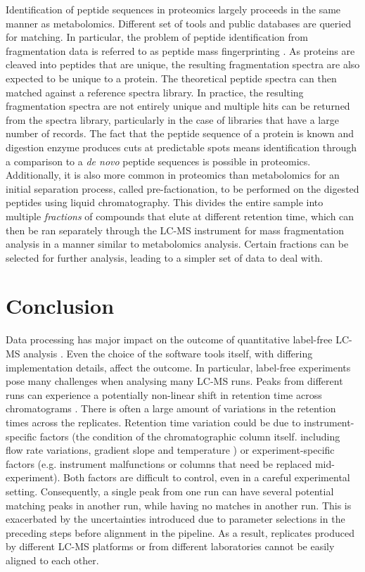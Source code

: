 Identification of peptide sequences in proteomics largely proceeds in the same manner as metabolomics. Different set of tools and public databases are queried for matching. In particular, the problem of peptide identification from fragmentation data is referred to as peptide mass fingerprinting \cite{Sandin2014}. As proteins are cleaved into peptides that are unique, the resulting fragmentation spectra are also expected to be unique to a protein. The theoretical peptide spectra can then matched against a reference spectra library. In practice, the resulting fragmentation spectra are not entirely unique and multiple hits can be returned from the spectra library, particularly in the case of libraries that have a large number of records. The fact that the peptide sequence of a protein is known and digestion enzyme produces cuts at predictable spots means identification through a comparison to a \textit{de novo} peptide sequences is possible in proteomics. Additionally, it is also more common in proteomics than metabolomics for an initial separation process, called pre-factionation, to be performed on the digested peptides using liquid chromatography. This divides the entire sample into multiple \emph{fractions} of compounds that elute at different retention time, which can then be ran separately through the LC-MS instrument for mass fragmentation analysis in a manner similar to metabolomics analysis. Certain fractions can be selected for further analysis, leading to a simpler set of data to deal with.

\section{Conclusion}

Data processing has major impact on the outcome of quantitative label-free LC-MS analysis \cite{Chawade2015}. Even the choice of the software tools itself, with differing implementation details, affect the outcome. In particular, label-free experiments pose many challenges when analysing many LC-MS runs. Peaks from different runs can experience a potentially non-linear shift in retention time across chromatograms \cite{Podwojski2009}. There is often a large amount of variations in the retention times across the replicates. Retention time variation could be due to instrument-specific factors (the condition of the chromatographic column itself. including flow rate variations, gradient slope and temperature \cite{Christin2008}) or experiment-specific factors (e.g. instrument malfunctions or columns that need be replaced mid-experiment). Both factors are difficult to control, even in a careful experimental setting. Consequently, a single peak from one run can have several potential matching peaks in another run, while having no matches in another run. This is exacerbated by the uncertainties introduced due to parameter selections in the preceding steps before alignment in the pipeline. As a result, replicates produced by different LC-MS platforms or from different laboratories cannot be easily aligned to each other. 

